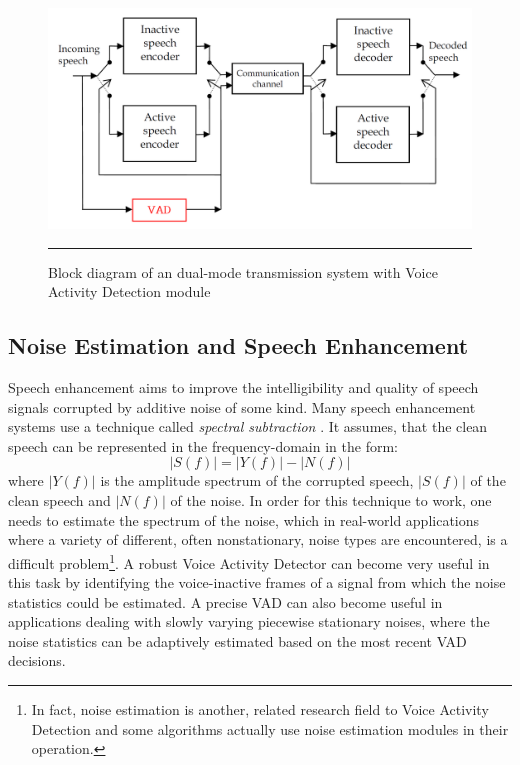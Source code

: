 \begin{figure}[htbp]
	\centering
		\includegraphics[width=1\columnwidth]{Figures/DTXVAD.png}
		\rule{37em}{0.5pt}
	\caption[Dual-mode transmission system with Voice Activity Detection module]{Block diagram of an dual-mode transmission system with Voice Activity Detection module \cite{G729}}
	\label{fig:DTXVAD}
\end{figure}

\subsection{Noise Estimation and Speech Enhancement}

Speech enhancement aims to improve the intelligibility and quality of speech signals corrupted by additive  noise of some kind. Many speech enhancement systems use a technique called \emph{spectral subtraction} \cite{Kondoz, RamirezGorriz}. It assumes, that the clean speech can be represented in the frequency-domain in the form:
\begin{equation}
|S(f)| = |Y(f)| - |N(f)|
\end{equation}
where $|Y(f)|$ is the amplitude spectrum of the corrupted speech, $|S(f)|$ of the clean speech and $|N(f)|$ of the noise. In order for this technique to work, one needs to estimate the spectrum of the noise, which in real-world applications where a variety of different, often nonstationary, noise types are encountered, is a difficult problem\footnote{In fact, noise estimation is another, related research field to Voice Activity Detection and some algorithms actually use noise estimation modules in their operation.}. A robust Voice Activity Detector can become very useful in this task by identifying the voice-inactive frames of a signal from which the noise statistics could be estimated. A precise VAD can also become useful in applications dealing with slowly varying piecewise stationary noises, where the noise statistics can be adaptively estimated based on the most recent VAD decisions.

